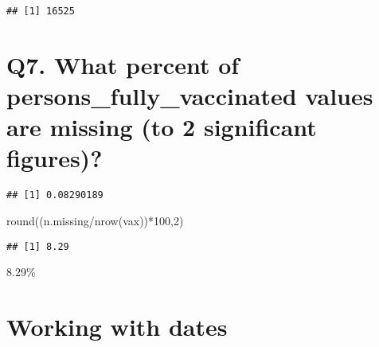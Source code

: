 \documentclass[
]{article}
\newenvironment{Shaded}{\begin{snugshade}}{\end{snugshade}}
\newcommand{\DecValTok}[1]{\textcolor[rgb]{0.00,0.00,0.81}{#1}}
\newcommand{\FunctionTok}[1]{\textcolor[rgb]{0.00,0.00,0.00}{#1}}
\newcommand{\NormalTok}[1]{#1}
\newcommand{\OtherTok}[1]{\textcolor[rgb]{0.56,0.35,0.01}{#1}}
\newcommand{\SpecialCharTok}[1]{\textcolor[rgb]{0.00,0.00,0.00}{#1}}
\begin{document}
\begin{Shaded}
\end{Shaded}

\begin{verbatim}
## [1] 16525
\end{verbatim}

\hypertarget{q7.-what-percent-of-persons_fully_vaccinated-values-are-missing-to-2-significant-figures}{%
\section{Q7. What percent of persons\_fully\_vaccinated values are
missing (to 2 significant
figures)?}\label{q7.-what-percent-of-persons_fully_vaccinated-values-are-missing-to-2-significant-figures}}

\begin{Shaded}
\end{Shaded}

\begin{verbatim}
## [1] 0.08290189
\end{verbatim}

\begin{Shaded}
\begin{Highlighting}[]
\FunctionTok{round}\NormalTok{((n.missing}\SpecialCharTok{/}\FunctionTok{nrow}\NormalTok{(vax))}\SpecialCharTok{*}\DecValTok{100}\NormalTok{,}\DecValTok{2}\NormalTok{)}
\end{Highlighting}
\end{Shaded}

\begin{verbatim}
## [1] 8.29
\end{verbatim}

8.29\%

\hypertarget{working-with-dates}{%
\section{Working with dates}\label{working-with-dates}}
\end{document}
